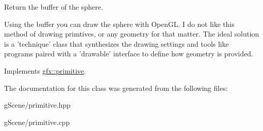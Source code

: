 Return the buffer of the sphere. 

Using the buffer you can draw the sphere with Open\-G\-L. I do not like this method of drawing primtives, or any geometry for that matter. The ideal solution is a 'technique' class that synthesizes the drawing settings and tools like programs paired with a 'drawable' interface to define how geometry is provided. 

Implements \hyperlink{classgfx_1_1primitive}{gfx\-::primitive}.



The documentation for this class was generated from the following files\-:\begin{DoxyCompactItemize}
\item 
g\-Scene/primitive.\-hpp\item 
g\-Scene/primitive.\-cpp\end{DoxyCompactItemize}
